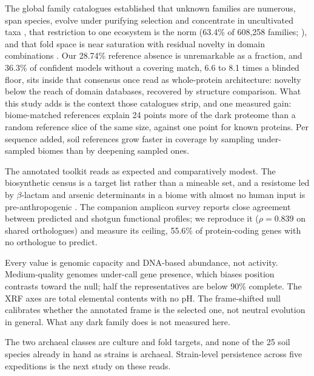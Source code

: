 \documentclass[11pt]{article}
\begin{document}
The global family catalogues established that unknown families are numerous, span species, evolve
under purifying selection and concentrate in uncultivated taxa
\citep{rodriguezdelrio2024fesnov,pavlopoulos2023darkmatter,vanni2022agnostos}, that restriction to
one ecosystem is the norm (63.4\% of 608{,}258 families; \citealp{aplakidou2025quadrupling}), and
that fold space is near saturation with residual novelty in domain combinations
\citep{lau2024ted,yeo2025afesm}. Our 28.74\% reference absence is unremarkable as a fraction, and
36.3\% of confident models without a covering match, 6.6 to 8.1 times a blinded floor, sits inside
that consensus once read as whole-protein architecture: novelty below the reach of domain databases,
recovered by structure comparison. What this study adds is the context those catalogues
strip, and one measured gain: biome-matched references explain 24 points more of the dark proteome
than a random reference slice of the same size, against one point for known proteins. Per sequence
added, soil references grow faster in coverage by sampling under-sampled biomes than by deepening
sampled ones.

The annotated toolkit reads as expected and comparatively modest.
The biosynthetic census is a target list rather than a mineable set, and a
resistome led by $\beta$-lactam and arsenic determinants in a biome with almost no human input is
pre-anthropogenic \citep{dcosta2011ancient,vangoethem2018antarctic}. The companion amplicon survey
reports close agreement between predicted and shotgun functional profiles; we reproduce it
($\rho = 0.839$ on shared orthologues) and measure its ceiling, 55.6\% of protein-coding genes with
no orthologue to predict.

Every value is genomic capacity and DNA-based abundance, not activity. Medium-quality genomes
under-call gene presence, which biases position contrasts toward the null; half the representatives
are below 90\% complete. The XRF axes are total elemental contents with no pH. The frame-shifted null
calibrates whether the annotated frame is the selected one, not neutral evolution in general. What
any dark family does is not measured here.

The two archaeal classes are culture and fold targets, and none of the 25 soil species already in
hand as strains is archaeal. Strain-level persistence across five expeditions is the next study on
these reads.
\end{document}
